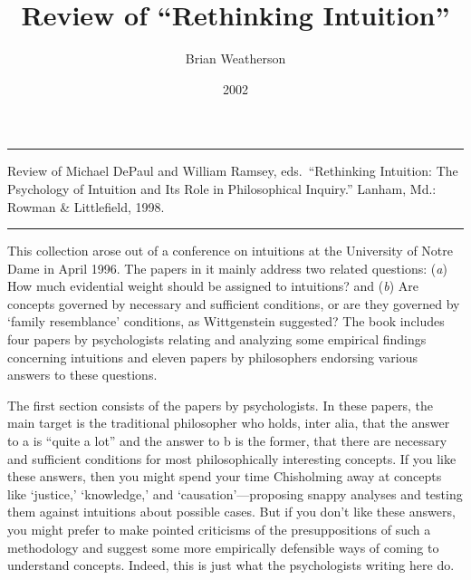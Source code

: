 \documentclass[
  10pt,
  letterpaper,
  DIV=11,
  numbers=noendperiod,
  twoside]{scrartcl}
\title{Review of ``Rethinking Intuition''}
\author{Brian Weatherson}
\date{2002}
\renewenvironment{abstract}
 {\vspace{-1.25cm}
 \quotation\small\noindent\rule{\linewidth}{.5pt}\par\smallskip
 \noindent }
 {\par\noindent\rule{\linewidth}{.5pt}\endquotation}
\begin{document}
\maketitle
\begin{abstract}
Review of Michael DePaul and William Ramsey, eds.~``Rethinking
Intuition: The Psychology of Intuition and Its Role in Philosophical
Inquiry.'' Lanham, Md.: Rowman \& Littlefield, 1998.
\end{abstract}

This collection arose out of a conference on intuitions at the
University of Notre Dame in April 1996. The papers in it mainly address
two related questions: (\emph{a}) How much evidential weight should be
assigned to intuitions? and (\emph{b}) Are concepts governed by
necessary and sufficient conditions, or are they governed by `family
resemblance' conditions, as Wittgenstein suggested? The book includes
four papers by psychologists relating and analyzing some empirical
findings concerning intuitions and eleven papers by philosophers
endorsing various answers to these questions.

The first section consists of the papers by psychologists. In these
papers, the main target is the traditional philosopher who holds, inter
alia, that the answer to a is ``quite a lot'' and the answer to b is the
former, that there are necessary and sufficient conditions for most
philosophically interesting concepts. If you like these answers, then
you might spend your time Chisholming away at concepts like `justice,'
`knowledge,' and `causation'---proposing snappy analyses and testing
them against intuitions about possible cases. But if you don't like
these answers, you might prefer to make pointed criticisms of the
presuppositions of such a methodology and suggest some more empirically
defensible ways of coming to understand concepts. Indeed, this is just
what the psychologists writing here do.
\end{document}
